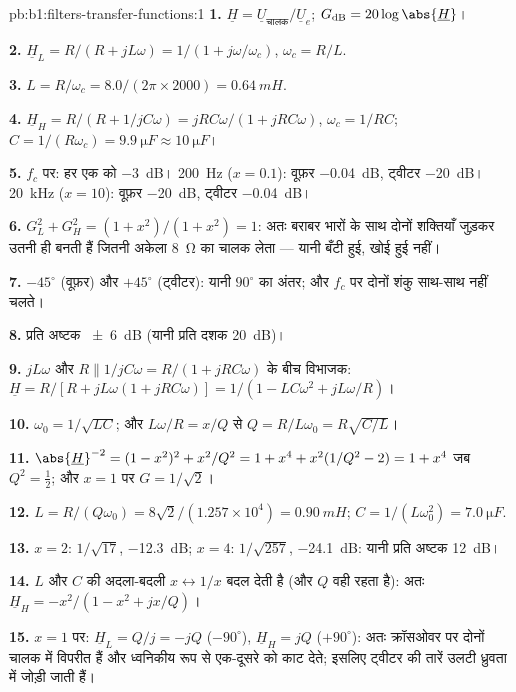 \begin{solution}{pb:b1:filters-transfer-functions:1}
\textbf{1.} $\underline H = \underline U_{\text{चालक}}/\underline U_e$;
$G_{\mathrm{dB}} = 20\log\abs{\underline H}$।

\textbf{2.} $\underline H_L = R/(R + jL\omega) = 1/(1 + j\omega/\omega_c)$,
$\omega_c = R/L$.

\textbf{3.} $L = R/\omega_c = 8.0/(2\pi \times 2000) = \qty{0.64}{mH}$.

\textbf{4.} $\underline H_H = R/(R + 1/jC\omega) = jRC\omega/(1 + jRC\omega)$,
$\omega_c = 1/RC$; $C = 1/(R\omega_c) = \qty{9.9}{\micro F} \approx
\qty{10}{\micro F}$।

\textbf{5.} $f_c$ पर: हर एक को \qty{-3}{dB}। \qty{200}{Hz} ($x = 0.1$): वूफ़र
\qty{-0.04}{dB}, ट्वीटर \qty{-20}{dB}। \qty{20}{kHz} ($x = 10$): वूफ़र
\qty{-20}{dB}, ट्वीटर \qty{-0.04}{dB}।

\textbf{6.} $G_L^2 + G_H^2 = (1 + x^2)/(1 + x^2) = 1$: अतः बराबर भारों के साथ
दोनों शक्तियाँ जुड़कर उतनी ही बनती हैं जितनी अकेला \qty{8}{\ohm} का चालक
लेता --- यानी बँटी हुई, खोई हुई नहीं।

\textbf{7.} $-45^\circ$ (वूफ़र) और $+45^\circ$ (ट्वीटर): यानी $90^\circ$
का अंतर; और $f_c$ पर दोनों शंकु साथ-साथ नहीं चलते।

\textbf{8.} प्रति अष्टक \qty{\pm 6}{dB} (यानी प्रति दशक \qty{20}{dB})।

\textbf{9.} $jL\omega$ और $R \parallel 1/jC\omega =
R/(1 + jRC\omega)$ के बीच विभाजक: $\underline H = R/[R + jL\omega(1 + jRC\omega)] =
1/(1 - LC\omega^2 + jL\omega/R)$।

\textbf{10.} $\omega_0 = 1/\sqrt{LC}$; और $L\omega/R = x/Q$ से $Q =
R/L\omega_0 = R\sqrt{C/L}$।

\textbf{11.} $\abs{\underline H}^{-2} = (1 - x^2)^2 + x^2/Q^2 = 1 + x^4 +
x^2(1/Q^2 - 2) = 1 + x^4$ जब $Q^2 = \tfrac12$; और $x = 1$ पर $G = 1/\sqrt2$।

\textbf{12.} $L = R/(Q\omega_0) = 8\sqrt2/(1.257\times10^4) = \qty{0.90}{mH}$;
$C = 1/(L\omega_0^2) = \qty{7.0}{\micro F}$.

\textbf{13.} $x = 2$: $1/\sqrt{17}$, \qty{-12.3}{dB}; $x = 4$: $1/\sqrt{257}$,
\qty{-24.1}{dB}: यानी प्रति अष्टक \qty{12}{dB}।

\textbf{14.} $L$ और $C$ की अदला-बदली $x \leftrightarrow 1/x$ बदल देती है (और
$Q$ वही रहता है): अतः $\underline H_H = -x^2/(1 - x^2 + jx/Q)$।

\textbf{15.} $x = 1$ पर: $\underline H_L = Q/j = -jQ$ ($-90^\circ$),
$\underline H_H = jQ$ ($+90^\circ$): अतः क्रॉसओवर पर दोनों चालक  में
विपरीत हैं और ध्वनिकीय रूप से एक-दूसरे को काट देते; इसलिए ट्वीटर की तारें
उलटी ध्रुवता में जोड़ी जाती हैं।


\end{solution}

